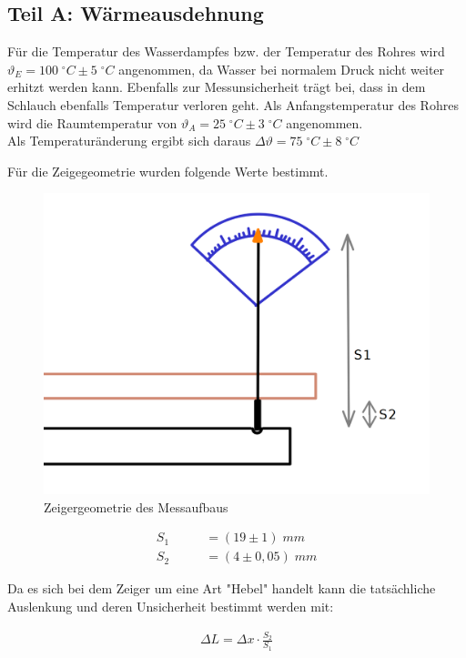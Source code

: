 \documentclass[a4paper]{scrartcl}
\numberwithin{equation}{subsection}
\begin{document}
\subsection{Teil A: Wärmeausdehnung}

Für die Temperatur des Wasserdampfes bzw. der Temperatur des Rohres wird $\vartheta_E = 100\; ^\circ C \pm 5\; ^\circ C$ angenommen, da Wasser bei normalem Druck nicht weiter erhitzt werden kann. Ebenfalls zur Messunsicherheit trägt bei, dass in dem Schlauch ebenfalls Temperatur verloren geht. Als Anfangstemperatur des Rohres wird die Raumtemperatur von $\vartheta_A = 25\; ^\circ C \pm 3\; ^\circ C$ angenommen.\\

Als Temperaturänderung ergibt sich daraus $\Delta \vartheta = 75\; ^\circ C \pm 8\; ^\circ C$

Für die Zeigegeometrie wurden folgende Werte bestimmt.

\begin{figure}[H]
\includegraphics[width=12cm]{Abbildungen/aufbau_warmeausdehnung}
\centering
\caption{Zeigergeometrie des Messaufbaus}
\centering
\label{fig:bindungselektronen}
\end{figure}

\begin{align*}
S_1 \qquad 	& = (19 \pm 1)\;mm \\
S_2	\qquad 	& = (4 \pm 0,05)\;mm
\end{align*}

Da es sich bei dem Zeiger um eine Art "Hebel" handelt kann die tatsächliche Auslenkung und deren Unsicherheit bestimmt werden mit:

\begin{align}
\Delta L = \Delta x \cdot \frac{S_2}{S_1}
\end{align}
\end{document}
